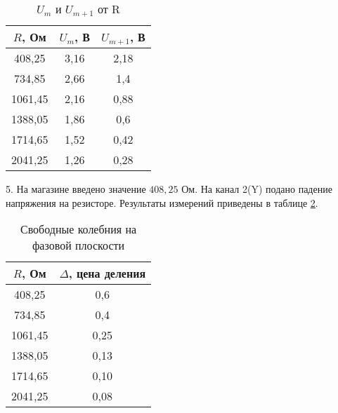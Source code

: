 \begin{table}[h]
    \centering
    \begin{tabular}{|c|c|c|}
        \hline
        $R$, Ом & $U_m$, В & $U_{m+1}$, В \\
        \hline
        408,25  & 3,16 & 2,18 \\
        \hline
        734,85  & 2,66 & 1,4 \\
        \hline
        1061,45 & 2,16 & 0,88 \\
        \hline
        1388,05 & 1,86 & 0,6 \\
        \hline
        1714,65 & 1,52 & 0,42 \\
        \hline
        2041,25 & 1,26 & 0,28 \\
        \hline
    \end{tabular}
    \caption{$U_m$ и $U_{m+1}$ от R}
    \label{tab:2}
\end{table}

5. На магазине введено значение $408,25$ Ом. На канал 2(Y) подано падение напряжения на резисторе. Результаты измерений приведены в таблице \ref{tab:3}.

\begin{table}[h]
    \centering
    \begin{tabular}{|c|c|}
        \hline
        $R$, Ом & $\Delta$, цена деления \\
        \hline
        408,25 & 0,6 \\
        \hline
        734,85 & 0,4 \\
        \hline
        1061,45 & 0,25 \\
        \hline
        1388,05 & 0,13 \\
        \hline
        1714,65 & 0,10 \\
        \hline
        2041,25 & 0,08 \\
        \hline
    \end{tabular}
    \caption{Свободные колебния на фазовой плоскости}
    \label{tab:3}
\end{table}

